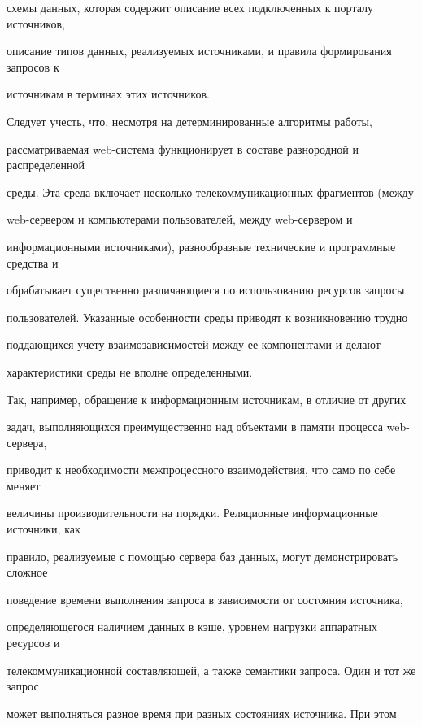 схемы данных, которая содержит описание всех подключенных к порталу источников, 


описание типов данных, реализуемых источниками, и правила формирования запросов к 


источникам в терминах этих источников.


      


      Следует учесть, что, несмотря на детерминированные алгоритмы работы, 


рассматриваемая web-сис\-те\-ма функционирует в составе разнородной и распределенной 


среды. Эта среда вклю\-ча\-ет несколько телекоммуникационных фрагментов (между 


web-сер\-ве\-ром и компьютерами пользователей, между web-сер\-ве\-ром и 


информационными источниками), разнообразные технические и программные средства и 


обрабатывает существенно раз\-ли\-ча\-ющи\-еся по использованию ресурсов запросы 


пользователей. Указанные особенности среды приводят к возникновению труд\-но 


поддающихся учету взаимозависимостей между ее ком\-по\-нен\-та\-ми и делают 


характеристики среды не вполне определенными.


      


      Так, например, обращение к информационным источникам, в отличие от других 


задач, выполняющихся преимущественно над объектами в памяти процесса web-сервера, 


приводит к необходимости межпроцессного взаимодействия, что само по себе меняет 


величины производительности на порядки. Реляционные информационные источники, как 


правило, реализуемые с по\-мощью сервера баз данных, могут демонстрировать сложное 


поведение времени выполнения запроса в зависимости от состояния источника, 


определяющегося наличием данных в кэше, уровнем нагрузки аппаратных ресурсов и 


телекоммуникационной со\-став\-ля\-ющей, а также семантики запроса. Один и тот же запрос 


может выполняться разное время при разных состояниях источника. При этом 


